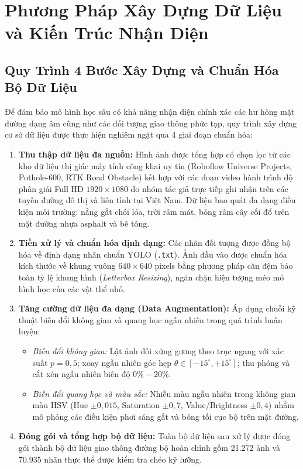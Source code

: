 \documentclass[12pt,a4paper]{article}
\begin{document}
\newpage
\section{Phương Pháp Xây Dựng Dữ Liệu và Kiến Trúc Nhận Diện}
\label{sec:du_lieu_va_kien_truc}

\subsection{Quy Trình 4 Bước Xây Dựng và Chuẩn Hóa Bộ Dữ Liệu}
\label{subsec:quy_trinh_du_lieu}
Để đảm bảo mô hình học sâu có khả năng nhận diện chính xác các hư hỏng mặt đường dạng âm cũng như các đối tượng giao thông phức tạp, quy trình xây dựng cơ sở dữ liệu được thực hiện nghiêm ngặt qua 4 giai đoạn chuẩn hóa:
\begin{enumerate}
    \item \textbf{Thu thập dữ liệu đa nguồn:} Hình ảnh được tổng hợp có chọn lọc từ các kho dữ liệu thị giác máy tính công khai uy tín (Roboflow Universe Projects, Pothole-600, RTK Road Obstacle) kết hợp với các đoạn video hành trình độ phân giải Full HD $1920 \times 1080$ do nhóm tác giả trực tiếp ghi nhận trên các tuyến đường đô thị và liên tỉnh tại Việt Nam. Dữ liệu bao quát đa dạng điều kiện môi trường: nắng gắt chói lóa, trời râm mát, bóng râm cây cối đổ trên mặt đường nhựa asphalt và bê tông.
    \item \textbf{Tiền xử lý và chuẩn hóa định dạng:} Các nhãn đối tượng được đồng bộ hóa về định dạng nhãn chuẩn YOLO (\texttt{.txt}). Ảnh đầu vào được chuẩn hóa kích thước về khung vuông $640 \times 640$ pixels bằng phương pháp căn đệm bảo toàn tỷ lệ khung hình (\textit{Letterbox Resizing}), ngăn chặn hiện tượng méo mó hình học của các vật thể nhỏ.
    \item \textbf{Tăng cường dữ liệu đa dạng (Data Augmentation):} Áp dụng chuỗi kỹ thuật biến đổi không gian và quang học ngẫu nhiên trong quá trình huấn luyện:
    \begin{itemize}
        \item \textit{Biến đổi không gian:} Lật ảnh đối xứng gương theo trục ngang với xác suất $p = 0,5$; xoay ngẫu nhiên góc hẹp $\theta \in [-15^\circ, +15^\circ]$; thu phóng và cắt xén ngẫu nhiên biên độ $0\% - 20\%$.
        \item \textit{Biến đổi quang học và màu sắc:} Nhiễu màu ngẫu nhiên trong không gian màu HSV (Hue $\pm 0,015$, Saturation $\pm 0,7$, Value/Brightness $\pm 0,4$) nhằm mô phỏng các điều kiện phơi sáng gắt và bóng tối cục bộ trên mặt đường.
    \end{itemize}
    \item \textbf{Đóng gói và tổng hợp bộ dữ liệu:} Toàn bộ dữ liệu sau xử lý được đóng gói thành bộ dữ liệu giao thông đường bộ hoàn chỉnh gồm 21.272 ảnh và 70.935 nhãn thực thể được kiểm tra chéo kỹ lưỡng.
\end{enumerate}
\end{document}
